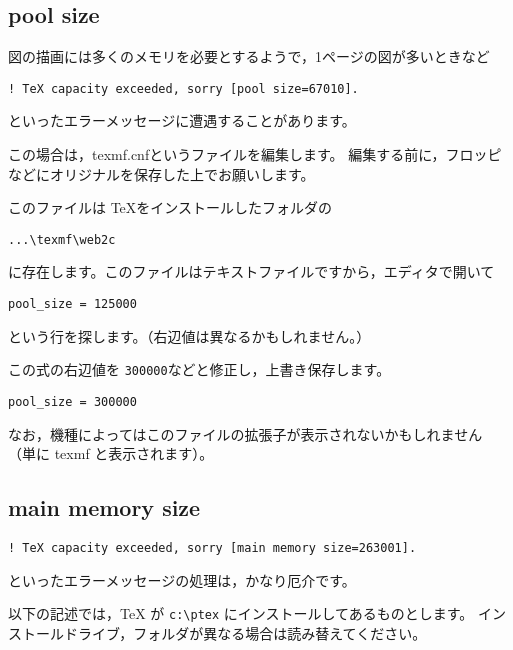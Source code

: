 \documentclass[fleqn,a4j]{jarticle}
\begin{document}
\subsection{pool size}
図の描画には多くのメモリを必要とするようで，1ページの図が多いときなど
\begin{jquote}
\begin{verbatim}
! TeX capacity exceeded, sorry [pool size=67010].
\end{verbatim}
\end{jquote}
といったエラーメッセージに遭遇することがあります。

この場合は，\textsf{texmf.cnf}というファイルを編集します。
編集する前に，フロッピなどにオリジナルを保存した上でお願いします。

このファイルは \TeX をインストールしたフォルダの
\begin{jquote}
\begin{verbatim}
...\texmf\web2c
\end{verbatim}
\end{jquote}
に存在します。このファイルはテキストファイルですから，エディタで開いて
\begin{jquote}
\begin{verbatim}
pool_size = 125000
\end{verbatim}
\end{jquote}
という行を探します。（右辺値は異なるかもしれません。）

この式の右辺値を \texttt{300000}などと修正し，上書き保存します。
\begin{jquote}
\begin{verbatim}
pool_size = 300000
\end{verbatim}
\end{jquote}

なお，機種によってはこのファイルの拡張子が表示されないかもしれません
（単に texmf と表示されます）。

\subsection{main memory size}
\begin{jquote}%
\begin{verbatim}
! TeX capacity exceeded, sorry [main memory size=263001].
\end{verbatim}
\end{jquote}
といったエラーメッセージの処理は，かなり厄介です。

以下の記述では，TeX が \verb/c:\ptex/ にインストールしてあるものとします。
インストールドライブ，フォルダが異なる場合は読み替えてください。
\end{document}
